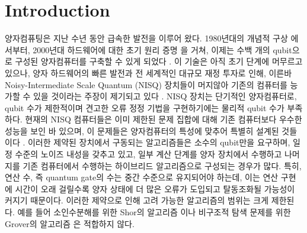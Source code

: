 \section{Introduction}

양자컴퓨팅은 지난 수년 동안 급속한 발전을 이루어 왔다. 1980년대의 개념적 구상 \cite{Benioff1980, Feynman1982}에서부터, 2000년대 하드웨어에 대한 초기 원리 증명 \cite{Chuang1998, Jones1999, Leung2000, Vandersypen2001, Haffner2005, Negrevergne2006, Plantenberg2007, Hanneke2009, Monz2011, Devitt2013, Devitt2016, Monz2016}을 거쳐, 이제는 수백 개의 qubit으로 구성된 양자컴퓨터를 구축할 수 있게 되었다 \cite{Jurcevic2021, Pino2021, Ebadi2021}. 이 기술은 아직 초기 단계에 머무르고 있으나, 양자 하드웨어의 빠른 발전과 전 세계적인 대규모 재정 투자로 인해, 이른바 Noisy-Intermediate Scale Quantum (NISQ) 장치들이 머지않아 기존의 컴퓨터를 능가할 수 있을 것이라는 주장이 제기되고 있다 \cite{preskillQuantumComputingNISQ2018, Brooks2019, Arute2019, Zhong2020, Wu2021, Madsen2022}. NISQ 장치는 단기적인 양자컴퓨터로, qubit 수가 제한적이며 견고한 오류 정정 기법을 구현하기에는 물리적 qubit 수가 부족하다. 현재의 NISQ 컴퓨터들은 이미 제한된 문제 집합에 대해 기존 컴퓨터보다 우수한 성능을 보인 바 있으며, 이 문제들은 양자컴퓨터의 특성에 맞추어 특별히 설계된 것들이다 \cite{Arute2019, Zhong2020, Wu2021}. 이러한 제약된 장치에서 구동되는 알고리즘들은 소수의 qubit만을 요구하며, 일정 수준의 노이즈 내성을 갖추고 있고, 일부 계산 단계를 양자 장치에서 수행하고 나머지를 기존 컴퓨터에서 수행하는 하이브리드 알고리즘으로 구성되는 경우가 많다. 특히, 연산 수, 즉 quantum gate의 수는 중간 수준으로 유지되어야 하는데, 이는 연산 구현에 시간이 오래 걸릴수록 양자 상태에 더 많은 오류가 도입되고 탈동조화될 가능성이 커지기 때문이다. 이러한 제약으로 인해 고려 가능한 알고리즘의 범위는 크게 제한된다. 예를 들어 소인수분해를 위한 Shor의 알고리즘 \cite{shorAlgorithmsQuantumComputation, Vandersypen2001, ChaoYang2007, Lanyon2007, Lucero2012, MartinLopez2012, Markov2013, Amico2019}이나 비구조적 탐색 문제를 위한 Grover의 알고리즘 \cite{groverFastQuantumMechanical1996, Bennett1997, Cerf2000, Ambainis2004, Ambainis2007, Bernstein2010}은 적합하지 않다.

